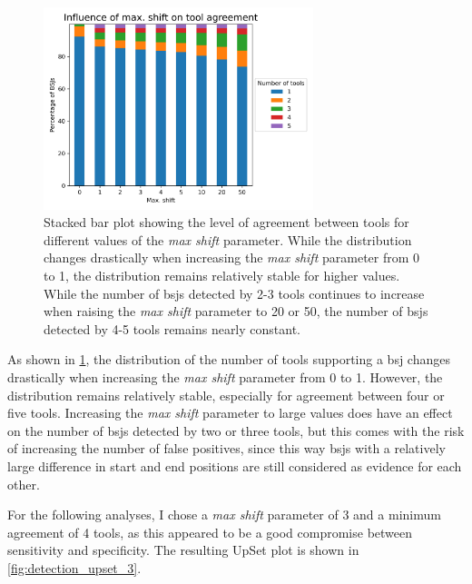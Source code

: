 \begin{figure}[H]
    \centering

    \includegraphics[width=0.7\textwidth]{chapters/4_results_and_discussion/figures/detection/shift_agreement.png}
    \caption{Stacked bar plot showing the level of agreement between tools for
        different values of the \textit{max shift} parameter.
        While the distribution changes drastically when increasing the \textit{max
            shift} parameter from 0 to 1, the distribution remains relatively stable for
        higher values.
        While the number of \glspl{bsj} detected by 2-3 tools continues to increase when
        raising the \textit{max shift} parameter to 20 or 50, the number of \glspl{bsj}
        detected by 4-5 tools remains nearly constant.
    }
    \label{fig:shift_agreement}
\end{figure}

As shown in \cref{fig:shift_agreement}, the distribution of the number of tools
supporting a \gls{bsj} changes drastically when increasing the \textit{max
    shift} parameter from 0 to 1.
However, the distribution remains relatively stable, especially for agreement
between four or five tools.
Increasing the \textit{max shift} parameter to large values does have an effect
on the number of \glspl{bsj} detected by two or three tools, but this comes with
the risk of increasing the number of false positives, since this way \glspl{bsj}
with a relatively large difference in start and end positions are still
considered as evidence for each other.

For the following analyses, I chose a \textit{max shift} parameter of 3 and a
minimum agreement of 4 tools, as this appeared to be a good compromise between
sensitivity and specificity.
The resulting UpSet plot is shown in \cref{fig:detection_upset_3}.


